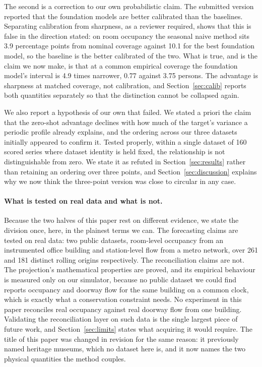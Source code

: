 \documentclass[11pt]{article}
\theoremstyle{plain}
\theoremstyle{definition}
\theoremstyle{remark}
\newif\ifrevisionmarkup
\newcommand{\new}[1]{\ifrevisionmarkup\textcolor{revision}{#1}\else#1\fi}
\begin{document}
\new{The second is a correction to our own probabilistic claim. The submitted version reported that the foundation models are better calibrated than the baselines. Separating calibration from sharpness, as a reviewer required, shows that this is false in the direction stated: on room occupancy the seasonal naive method sits \num{3.9} percentage points from nominal coverage against \num{10.1} for the best foundation model, so the baseline is the better calibrated of the two. What is true, and is the claim we now make, is that at a common empirical coverage the foundation model's interval is \num{4.9} times narrower, \num{0.77} against \num{3.75} persons. The advantage is sharpness at matched coverage, not calibration, and Section~\ref{sec:calib} reports both quantities separately so that the distinction cannot be collapsed again.}

We also report a hypothesis of our own that failed. We \new{stated a priori} the claim that the zero-shot advantage declines with how much of the target's variance a periodic profile already explains, and the ordering across our three datasets initially appeared to confirm it. Tested properly, within a single dataset of \num{160} scored series where dataset identity is held fixed, the relationship is not distinguishable from zero. We state it as refuted in Section~\ref{sec:results} rather than retaining an ordering over three points, and Section~\ref{sec:discussion} explains why we now think the three-point version was close to circular in any case.

\new{\paragraph{What is tested on real data and what is not.} Because the two halves of this paper rest on different evidence, we state the division once, here, in the plainest terms we can. The forecasting claims are tested on real data: two public datasets, room-level occupancy from an instrumented office building and station-level flow from a metro network, over \num{261} and \num{181} distinct rolling origins respectively. The reconciliation claims are not. The projection's mathematical properties are proved, and its empirical behaviour is measured only on our simulator, because no public dataset we could find reports occupancy and doorway flow for the same building on a common clock, which is exactly what a conservation constraint needs. No experiment in this paper reconciles real occupancy against real doorway flow from one building. Validating the reconciliation layer on such data is the single largest piece of future work, and Section~\ref{sec:limits} states what acquiring it would require. The title of this paper was changed in revision for the same reason: it previously named heritage museums, which no dataset here is, and it now names the two physical quantities the method couples.}
\end{document}
